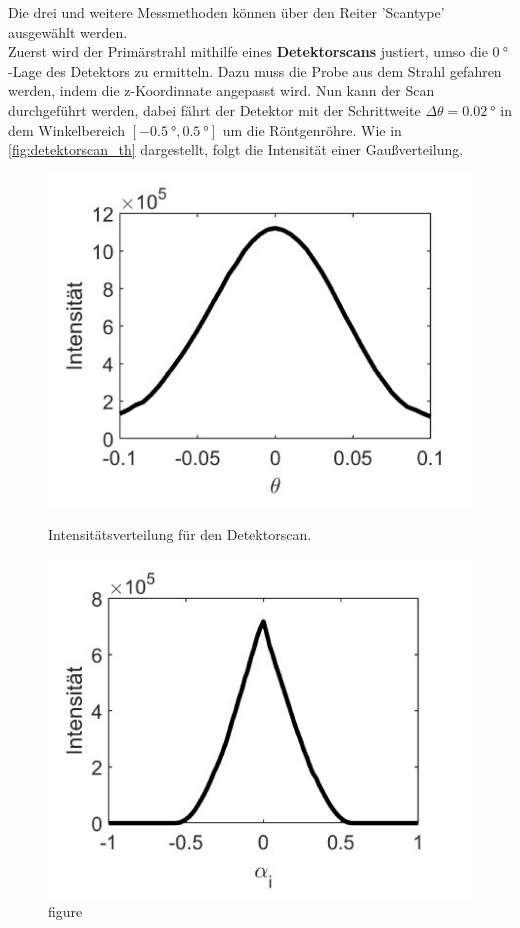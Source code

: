 Die drei und weitere Messmethoden können über den Reiter 'Scantype' ausgewählt werden.
\\
Zuerst wird der Primärstrahl mithilfe eines \textbf{Detektorscans} justiert, umso die $\SI{0}{\degree}$-Lage des Detektors zu ermitteln.
Dazu muss die Probe aus dem Strahl gefahren werden, indem die z-Koordinnate angepasst wird.
Nun kann der Scan durchgeführt werden, dabei fährt der Detektor mit der Schrittweite $\Delta \theta = \SI{0.02}{\degree}$ in dem Winkelbereich $[\SI{-0.5}{\degree}, \SI{0.5}{\degree}]$ um die Röntgenröhre.
Wie in \autoref{fig:detektorscan_th} dargestellt, folgt die Intensität einer Gaußverteilung.
\begin{figure}[ht]
    \centering
    \begin{minipage}[b]{0.45\linewidth}
      \centering
      \includegraphics[width=\textwidth]{content/data/detektorscan.jpg}
      \caption{figure}{Intensitätsverteilung für den Detektorscan.\cite[6]{anleitung}}
      \label{fig:detektorscan_th}
    \end{minipage}%
    \begin{minipage}[b]{0.45\linewidth}
      \centering
      \includegraphics[width=\textwidth]{content/data/rockingscan.jpg}

\end{minipage}
\end{figure}

